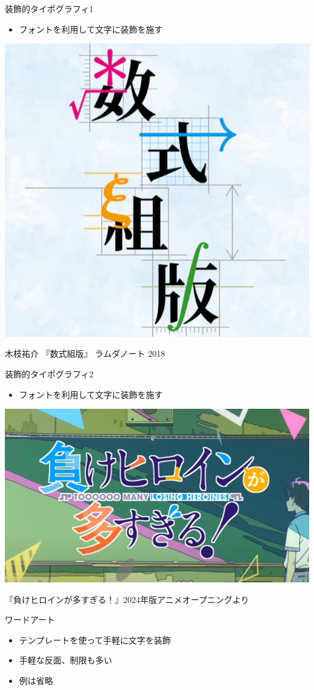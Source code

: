 \documentclass[unicode,14pt]{beamer}
\begin{document}
\begin{frame}[t]{装飾的タイポグラフィ1}
  \sffamily
  \begin{itemize}
\item フォントを利用して文字に装飾を施す
  \end{itemize}
  \begin{center}
    \includegraphics[width=.40\textwidth]{figures/sushiki-kumihan.png}
  \end{center}
\raggedleft\tiny\color{50gray} 木枝祐介 『数式組版』 ラムダノート 2018
\end{frame}

\begin{frame}[t]{装飾的タイポグラフィ2}
  \sffamily
  \begin{itemize}
\item フォントを利用して文字に装飾を施す
  \end{itemize}
  \begin{center}
    \includegraphics[width=.65\textwidth]{figures/makein.png}
  \end{center}
\raggedleft\tiny\color{50gray} 
『負けヒロインが多すぎる！』2024年版アニメオープニングより
\end{frame}

\begin{frame}[t]{ワードアート}
  \sffamily
  \begin{itemize}
\item テンプレートを使って手軽に文字を装飾
\item 手軽な反面、制限も多い
\item 例は省略
  \end{itemize}
\end{frame}
\end{document}
